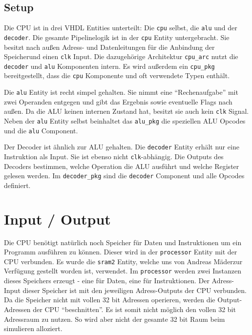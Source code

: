 \documentclass[paper=a4,fontsize=12pt,twocolumn]{scrreprt}
\begin{document}
\subsection{Setup}

Die CPU ist in drei VHDL Entities unterteilt: Die \texttt{cpu} selbst, die \texttt{alu} und der \texttt{decoder}.
Die gesamte Pipelinelogik ist in der \texttt{cpu} Entity untergebracht.
Sie besitzt nach außen Adress- und Datenleitungen für die Anbindung der Speicher\footnotemark und einen \texttt{clk} Input.
Die dazugehörige Architektur \texttt{cpu\_arc} nutzt die \texttt{decoder} und \texttt{alu} Komponenten intern.
Es wird außerdem ein \texttt{cpu\_pkg} bereitgestellt, dass die \texttt{cpu} Komponente und oft verwendete Typen enthält.

Die \texttt{alu} Entity ist recht simpel gehalten.
Sie nimmt eine \enquote{Rechenaufgabe} mit zwei Operanden entgegen und gibt das Ergebnis sowie eventuelle Flags nach außen.
Da die ALU keinen internen Zustand hat, besitzt sie auch kein \texttt{clk} Signal.
Neben der \texttt{alu} Entity selbst beinhaltet das \texttt{alu\_pkg} die speziellen ALU Opcodes und die \texttt{alu} Component.

Der Decoder ist ähnlich zur ALU gehalten.
Die \texttt{decoder} Entity erhält nur eine Instruktion als Input.
Sie ist ebenso nicht \texttt{clk}-abhängig.
Die Outputs des Decoders bestimmen, welche Operation die ALU ausführt und welche Register gelesen werden.
Im \texttt{decoder\_pkg} sind die \texttt{decoder} Component und alle Opcodes definiert.


\section{Input / Output}

Die CPU benötigt natürlich noch Speicher für Daten und Instruktionen um ein Programm ausführen zu können.
Dieser wird in der \texttt{processor} Entity mit der CPU verbunden.
Es wurde die \texttt{sram2} Entity, welche uns von Andreas Mäder\footnotemark zur Verfügung gestellt worden ist, verwendet.
Im \texttt{processor} werden zwei Instanzen dieses Speichers erzeugt - eine für Daten, eine für Instruktionen.
Der Adress-Input dieser Speicher ist mit den jeweiligen Adress-Outputs der CPU verbunden.
Da die Speicher nicht mit vollen 32 bit Adressen operieren, werden die Output-Adressen der CPU \enquote{beschnitten}.
Es ist somit nicht möglich den vollen 32 bit Adressraum zu nutzen.
So wird aber nicht der gesamte 32 bit Raum beim simulieren alloziert.
\end{document}
